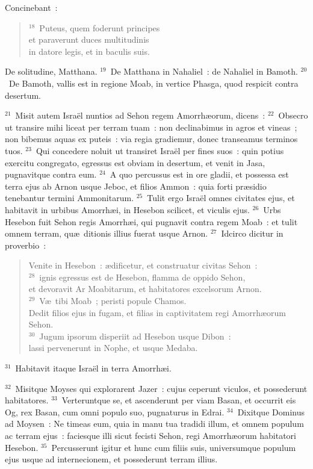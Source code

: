  Concinebant~:
\begin{verse}${}^{18}$~Puteus, quem foderunt principes\\ et paraverunt duces multitudinis\\ in datore legis, et in baculis suis.\end{verse}

 De solitudine, Matthana.
${}^{19}$~De Matthana in Nahaliel~: de Nahaliel in Bamoth.
${}^{20}$~De Bamoth, vallis est in regione Moab, in vertice Phasga, quod respicit contra desertum.


${}^{21}$~Misit autem Isra\"el nuntios ad Sehon regem Amorrh\ae orum, dicens~:
${}^{22}$~Obsecro ut transire mihi liceat per terram tuam~: non declinabimus in agros et vineas~; non bibemus aquas ex puteis~: via regia gradiemur, donec transeamus terminos tuos.
${}^{23}$~Qui concedere noluit ut transiret Isra\"el per fines suos~: quin potius exercitu congregato, egressus est obviam in desertum, et venit in Jasa, pugnavitque contra eum.
${}^{24}$~A quo percussus est in ore gladii, et possessa est terra ejus ab Arnon usque Jeboc, et filios Ammon~: quia forti pr\ae sidio tenebantur termini Ammonitarum.
${}^{25}$~Tulit ergo Isra\"el omnes civitates ejus, et habitavit in urbibus Amorrh\ae i, in Hesebon scilicet, et viculis ejus.
${}^{26}$~Urbs Hesebon fuit Sehon regis Amorrh\ae i, qui pugnavit contra regem Moab~: et tulit omnem terram, qu\ae\ ditionis illius fuerat usque Arnon.
${}^{27}$~Idcirco dicitur in proverbio~: \begin{verse}Venite in Hesebon~: \ae dificetur, et construatur civitas Sehon~:\\
${}^{28}$~ignis egressus est de Hesebon, flamma de oppido Sehon,\\ et devoravit Ar Moabitarum, et habitatores excelsorum Arnon.\\
${}^{29}$~V\ae\ tibi Moab~; peristi popule Chamos.\\ Dedit filios ejus in fugam, et filias in captivitatem regi Amorrh\ae orum Sehon.\\
${}^{30}$~Jugum ipsorum disperiit ad Hesebon usque Dibon~:\\ lassi pervenerunt in Nophe, et usque Medaba.\end{verse}


${}^{31}$~Habitavit itaque Isra\"el in terra Amorrh\ae i.


${}^{32}$~Misitque Moyses qui explorarent Jazer~: cujus ceperunt viculos, et possederunt habitatores.
${}^{33}$~Verteruntque se, et ascenderunt per viam Basan, et occurrit eis Og, rex Basan, cum omni populo suo, pugnaturus in Edrai.
${}^{34}$~Dixitque Dominus ad Moysen~: Ne timeas eum, quia in manu tua tradidi illum, et omnem populum ac terram ejus~: faciesque illi sicut fecisti Sehon, regi Amorrh\ae orum habitatori Hesebon.
${}^{35}$~Percusserunt igitur et hunc cum filiis suis, universumque populum ejus usque ad internecionem, et possederunt terram illius.

